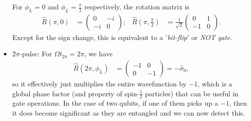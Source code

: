 \documentclass[lasers.tex]{subfiles}
\begin{document}
\begin{itemize}
        For $\phi_L=0$ and $\phi_L=\frac{\pi}{2}$ respectively, the rotation matrix is
        \begin{align}
            \hat{R}\left(\pi,0\right) &= \begin{pmatrix}0&-i\\-i&0\end{pmatrix}; & \hat{R}\left(\pi,\frac{\pi}{2}\right) &= \frac{1}{\sqrt{2}}\begin{pmatrix}0&1\\-1&0\end{pmatrix}.
        \end{align}
        Except for the sign change, this is equivalent to a '\emph{bit-flip}' or \emph{NOT gate}.
    \item $2\pi$-pulse:
        For $\Omega t_{2\pi}=2\pi$, we have
        \begin{align}
            \hat{R}\left(2\pi,\phi_L\right) &= \begin{pmatrix}-1&0\\0&-1\end{pmatrix} = -\hat{\sigma}_0,
        \end{align}
        so it effectively just multiplies the entire wavefunction by $-1$, which is a global phase factor (and property of spin-$\frac12$ particles) that can be useful in gate operations.
        In the case of two qubits, if one of them picks up a $-1$, then it does become significant as they are entangled and we can now detect this. 
\end{itemize}
\end{document}
